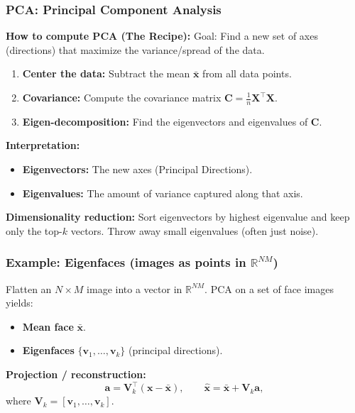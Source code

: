 \documentclass[11pt,a4paper]{article}
\newcommand{\R}{\mathbb{R}}
\newcommand{\vct}[1]{\bm{#1}}
\newcommand{\mat}[1]{\mathbf{#1}}
\begin{document}
\subsubsection{PCA: Principal Component Analysis}


\begin{mathrule}
\textbf{How to compute PCA (The Recipe):}
Goal: Find a new set of axes (directions) that maximize the variance/spread of the data.
\begin{enumerate}
  \item \textbf{Center the data:} Subtract the mean $\bar{\vct{x}}$ from all data points.
  \item \textbf{Covariance:} Compute the covariance matrix $\mat{C} = \frac{1}{n}\mat{X}^\top\mat{X}$.
  \item \textbf{Eigen-decomposition:} Find the eigenvectors and eigenvalues of $\mat{C}$.
\end{enumerate}
\textbf{Interpretation:}
\begin{itemize}
  \item \textbf{Eigenvectors:} The new axes (Principal Directions).
  \item \textbf{Eigenvalues:} The amount of variance captured along that axis.
\end{itemize}
\textbf{Dimensionality reduction:} Sort eigenvectors by highest eigenvalue and keep only the top-$k$ vectors. Throw away small eigenvalues (often just noise).
\end{mathrule}

\subsubsection{Example: Eigenfaces (images as points in \texorpdfstring{$\mathbb{R}^{NM}$}{R^{NM}})}
Flatten an $N\times M$ image into a vector in $\R^{NM}$. PCA on a set of face images yields:
\begin{itemize}
  \item \textbf{Mean face} $\bar{\vct{x}}$.
  \item \textbf{Eigenfaces} $\{\vct{v}_1,\dots,\vct{v}_k\}$ (principal directions).
\end{itemize}

\begin{mathrule}
\textbf{Projection / reconstruction:}
\[
\vct{a} = \mat{V}_k^\top (\vct{x}-\bar{\vct{x}}),
\qquad
\hat{\vct{x}} = \bar{\vct{x}} + \mat{V}_k \vct{a},
\]
where $\mat{V}_k=[\vct{v}_1,\dots,\vct{v}_k]$.
\end{mathrule}
\end{document}
